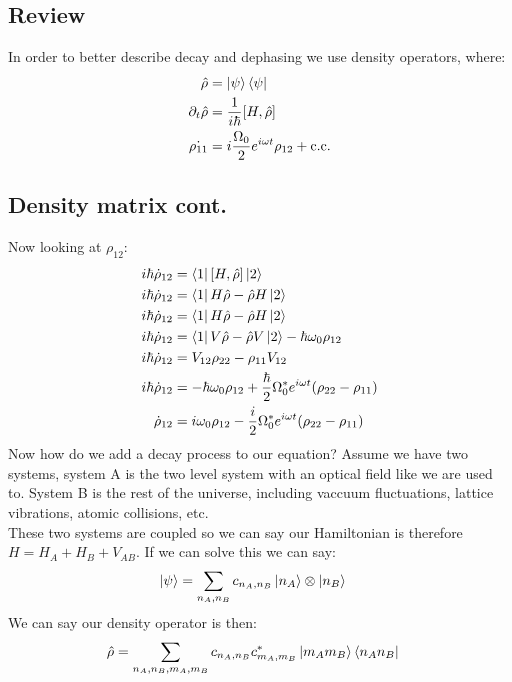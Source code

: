 \subsection{Review}
In order to better describe decay and dephasing we use density operators, where:
\begin{align*}
	\hat{\rho} &= \ket{\psi}\bra{\psi} \\
	\partial_t \hat{\rho} &= \frac{1}{i\hbar} [H,\hat{\rho}] \\
	\dot{\rho_{11}} &= i\frac{\Omega_0}{2} e^{i\omega t} \rho_{12} + \text{c.c.}
\end{align*}
\subsection{Density matrix cont.}
Now looking at $\rho_{12}$:
\begin{align*}
	i\hbar \dot{\rho}_{12} &= \bra{1}[H,\hat{\rho}]\ket{2} \\
	i\hbar \dot{\rho}_{12} &= \bra{1}H\hat{\rho} - \hat{\rho} H\ket{2} \\
	i\hbar \dot{\rho}_{12} &= \bra{1}H\hat{\rho} - \hat{\rho} H\ket{2} \\
	i\hbar \dot{\rho}_{12} &= \bra{1}V\hat{\rho} - \hat{\rho} V\ket{2} -\hbar\omega_0\rho_{12}\\
	i\hbar \dot{\rho}_{12} &= V_{12}\rho_{22} - \rho_{11} V_{12} \\
	i\hbar \dot{\rho}_{12} &= -\hbar\omega_0 \rho_{12} + \frac{\hbar}{2}\Omega_0^* e^{i\omega t} (\rho_{22} - \rho_{11}) \\
	\dot{\rho}_{12} &= i\omega_0 \rho_{12} - \frac{i}{2}\Omega_0^* e^{i\omega t} (\rho_{22} - \rho_{11})
\end{align*}
Now how do we add a decay process to our equation? Assume we have two systems, system A is the two level system with an optical field like we are used to. System B is the rest of the universe, including vaccuum fluctuations, lattice vibrations, atomic collisions, etc.\\
These two systems are coupled so we can say our Hamiltonian is therefore $H = H_A + H_B + V_{AB}$. If we can solve this we can say:
\begin{align*}
	\ket{\psi} &= \sum_{n_A,n_B} c_{n_A,n_B} \ket{n_A}\otimes\ket{n_B}
\end{align*}
We can say our density operator is then:
\begin{align*}
	\hat{\rho} &= \sum_{n_A,n_B,m_A,m_B} c_{n_A,n_B}c_{m_A,m_B}^* \ket{m_Am_B}\bra{n_An_B}
\end{align*}

